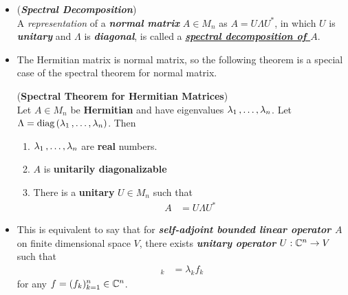 \documentclass[11pt]{article}
\begin{document}
\begin{itemize}
\item \begin{definition} (\emph{\textbf{Spectral Decomposition}})\\
A \emph{representation} of a \emph{\textbf{normal matrix}} $A \in M_n$ as $A = U \Lambda U^{*}$, in which $U$ is \emph{\textbf{unitary}} and $\Lambda$ is \emph{\textbf{diagonal}}, is called a \underline{\emph{\textbf{spectral decomposition of $A$}}}.
\end{definition}

\item The Hermitian matrix is normal matrix, so the following theorem is a special case of the spectral theorem for normal matrix.
\begin{theorem} (\textbf{Spectral Theorem for Hermitian Matrices})  \citep{horn2012matrix}\\
Let $A \in M_n$ be \textbf{Hermitian} and have eigenvalues $\lambda_1 \,{,}\ldots{,}\, \lambda_n$. Let $\Lambda = \text{diag}\left(\lambda_1 \,{,}\ldots{,}\, \lambda_n\right)$. Then
\begin{enumerate}
\item $\lambda_1 \,{,}\ldots{,}\, \lambda_n$ are \textbf{real} numbers.
\item $A$ is \textbf{unitarily diagonalizable}
\item There is a \textbf{unitary} $U \in M_n$ such that 
\begin{align*}
A &= U \Lambda U^{*}
\end{align*} 
\end{enumerate}
\end{theorem}

\item \begin{remark}
This is equivalent to say that for \emph{\textbf{self-adjoint bounded linear operator $A$}} on finite dimensional space $V$, there exists \emph{\textbf{unitary operator} $U: {\mathbb C}^n  \rightarrow V$} such that 
\begin{align*}
[U^{-1} A U f]_k &= \lambda_k f_k
\end{align*} for any $f = (f_k)_{k=1}^{n} \in {\mathbb C}^n$.
\end{remark}
\end{itemize}
\end{document}
